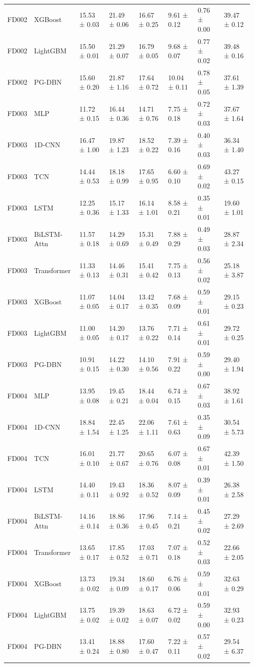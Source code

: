 \begin{table}
\begin{tabular}{llllllll}
FD002 & XGBoost & 15.53 ± 0.03 & 21.49 ± 0.06 & 16.67 ± 0.25 & 9.61 ± 0.12 & 0.76 ± 0.00 & 39.47 ± 0.12 \\
FD002 & LightGBM & 15.50 ± 0.01 & 21.29 ± 0.07 & 16.79 ± 0.05 & 9.68 ± 0.07 & 0.77 ± 0.02 & 39.48 ± 0.16 \\
FD002 & PG-DBN & 15.60 ± 0.20 & 21.87 ± 1.16 & 17.64 ± 0.72 & 10.04 ± 0.11 & 0.78 ± 0.05 & 37.61 ± 1.39 \\
FD003 & MLP & 11.72 ± 0.15 & 16.44 ± 0.36 & 14.71 ± 0.76 & 7.75 ± 0.18 & 0.72 ± 0.03 & 37.67 ± 1.64 \\
FD003 & 1D-CNN & 16.47 ± 1.00 & 19.87 ± 1.23 & 18.52 ± 0.22 & 7.39 ± 0.16 & 0.40 ± 0.03 & 36.34 ± 1.40 \\
FD003 & TCN & 14.44 ± 0.53 & 18.18 ± 0.99 & 17.65 ± 0.95 & 6.60 ± 0.10 & 0.69 ± 0.02 & 43.27 ± 0.15 \\
FD003 & LSTM & 12.25 ± 0.36 & 15.17 ± 1.33 & 16.14 ± 1.01 & 8.58 ± 0.21 & 0.35 ± 0.01 & 19.60 ± 1.01 \\
FD003 & BiLSTM-Attn & 11.57 ± 0.18 & 14.29 ± 0.69 & 15.31 ± 0.49 & 7.88 ± 0.29 & 0.49 ± 0.03 & 28.87 ± 2.34 \\
FD003 & Transformer & 11.33 ± 0.13 & 14.46 ± 0.31 & 15.41 ± 0.42 & 7.75 ± 0.13 & 0.56 ± 0.02 & 25.18 ± 3.87 \\
FD003 & XGBoost & 11.07 ± 0.05 & 14.04 ± 0.17 & 13.42 ± 0.35 & 7.68 ± 0.09 & 0.59 ± 0.01 & 29.15 ± 0.23 \\
FD003 & LightGBM & 11.00 ± 0.05 & 14.20 ± 0.17 & 13.76 ± 0.22 & 7.71 ± 0.14 & 0.61 ± 0.01 & 29.72 ± 0.25 \\
FD003 & PG-DBN & 10.91 ± 0.15 & 14.22 ± 0.30 & 14.10 ± 0.56 & 7.91 ± 0.22 & 0.59 ± 0.00 & 29.40 ± 1.94 \\
FD004 & MLP & 13.95 ± 0.08 & 19.45 ± 0.21 & 18.44 ± 0.04 & 6.74 ± 0.15 & 0.67 ± 0.03 & 38.92 ± 1.61 \\
FD004 & 1D-CNN & 18.84 ± 1.54 & 22.45 ± 1.25 & 22.06 ± 1.11 & 7.61 ± 0.63 & 0.35 ± 0.09 & 30.54 ± 5.73 \\
FD004 & TCN & 16.01 ± 0.10 & 21.77 ± 0.67 & 20.65 ± 0.76 & 6.07 ± 0.08 & 0.67 ± 0.01 & 42.39 ± 1.50 \\
FD004 & LSTM & 14.40 ± 0.11 & 19.43 ± 0.92 & 18.36 ± 0.52 & 8.07 ± 0.09 & 0.39 ± 0.01 & 26.38 ± 2.58 \\
FD004 & BiLSTM-Attn & 14.16 ± 0.14 & 18.86 ± 0.36 & 17.96 ± 0.45 & 7.14 ± 0.21 & 0.45 ± 0.02 & 27.29 ± 2.69 \\
FD004 & Transformer & 13.65 ± 0.17 & 17.85 ± 0.52 & 17.03 ± 0.71 & 7.07 ± 0.18 & 0.52 ± 0.03 & 22.66 ± 2.05 \\
FD004 & XGBoost & 13.73 ± 0.02 & 19.34 ± 0.09 & 18.60 ± 0.17 & 6.76 ± 0.06 & 0.59 ± 0.01 & 32.63 ± 0.29 \\
FD004 & LightGBM & 13.75 ± 0.02 & 19.39 ± 0.02 & 18.63 ± 0.07 & 6.72 ± 0.02 & 0.59 ± 0.00 & 32.93 ± 0.23 \\
FD004 & PG-DBN & 13.41 ± 0.24 & 18.88 ± 0.80 & 17.60 ± 0.47 & 7.22 ± 0.11 & 0.57 ± 0.02 & 29.54 ± 6.37 \\
\bottomrule
\end{tabular}
\end{table}
